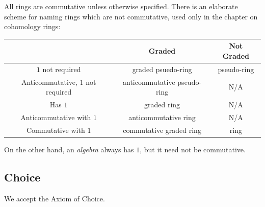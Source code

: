 All rings are commutative unless otherwise specified.
There is an elaborate scheme for naming rings which are not commutative,
used only in the chapter on cohomology rings:

\begin{center}
	\small
	\begin{tabular}[h]{|c|cc|}
		\hline
		& Graded & Not Graded \\ \hline
		$1$ not required & graded psuedo-ring & pseudo-ring \\
		Anticommutative, $1$ not required & anticommutative pseudo-ring & N/A \\ 
		Has $1$ & graded ring & N/A \\ 
		Anticommutative with $1$ & anticommutative ring & N/A \\ 
		Commutative with $1$ & commutative graded ring & ring \\ \hline
	\end{tabular}
\end{center}

On the other hand, an \emph{algebra} always has $1$,
but it need not be commutative.


\subsection*{Choice}
We accept the Axiom of Choice.
